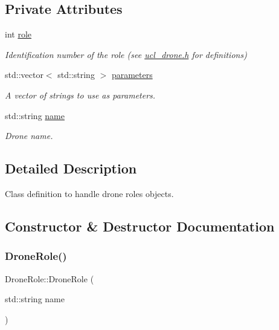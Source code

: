 \subsection*{Private Attributes}
\begin{DoxyCompactItemize}
\item 
\mbox{\label{classDroneRole_a7daa71aa6eade189dfb62337b2b56b63}} 
int \hyperlink{classDroneRole_a7daa71aa6eade189dfb62337b2b56b63}{role}
\begin{DoxyCompactList}\small\item\em Identification number of the role (see \hyperlink{ucl__drone_8h}{ucl\+\_\+drone.\+h} for definitions) \end{DoxyCompactList}\item 
\mbox{\label{classDroneRole_a389b433b4f99fb36cce468ae9ae698d1}} 
std\+::vector$<$ std\+::string $>$ \hyperlink{classDroneRole_a389b433b4f99fb36cce468ae9ae698d1}{parameters}
\begin{DoxyCompactList}\small\item\em A vector of strings to use as parameters. \end{DoxyCompactList}\item 
\mbox{\label{classDroneRole_a2677904c7efdc304a3849684ea426cc5}} 
std\+::string \hyperlink{classDroneRole_a2677904c7efdc304a3849684ea426cc5}{name}
\begin{DoxyCompactList}\small\item\em Drone name. \end{DoxyCompactList}\end{DoxyCompactItemize}


\subsection{Detailed Description}
Class definition to handle drone roles objects. 

\subsection{Constructor \& Destructor Documentation}
\mbox{\label{classDroneRole_af1b674a0c15bf46499eb9fe2b2f16755}} 
\subsubsection{\texorpdfstring{Drone\+Role()}{DroneRole()}}
{\footnotesize\ttfamily Drone\+Role\+::\+Drone\+Role (\begin{DoxyParamCaption}\item[{std\+::string}]{name }\end{DoxyParamCaption})}



